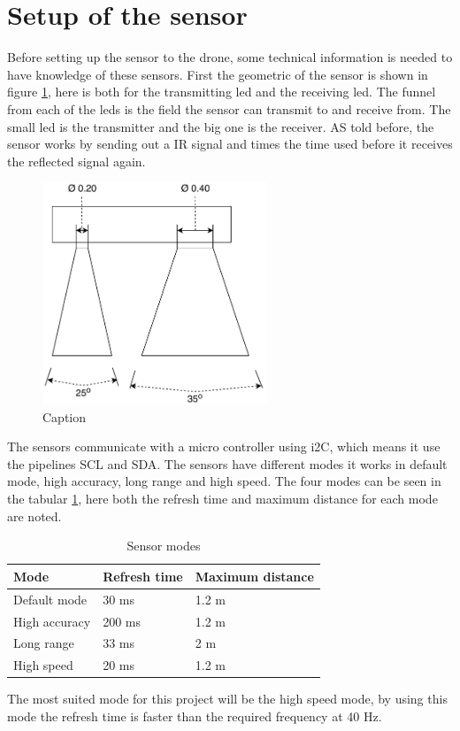 \section{Setup of the sensor}\label{setup_sensor}
Before setting up the sensor to the drone, some technical information is needed to have knowledge of these sensors.
First the geometric of the sensor is shown in figure \ref{fig:sensor_geometric}, here is both for the transmitting led and the receiving led. The funnel from each of the leds is the field the sensor can transmit to and receive from. The small led is the transmitter and the big one is the receiver. 
AS told before, the sensor works by sending out a IR signal and times the time used before it receives the reflected signal again.
\begin{figure}[H]
    \centering
    \includegraphics[width=0.6\textwidth]{figures/ch_design/Sensor.pdf}
    \caption{Caption}
    \label{fig:sensor_geometric}
\end{figure}
The sensors communicate with a micro controller using i2C, which means it use the pipelines SCL and SDA. The sensors have different modes it works in default mode, high accuracy, long range and high speed. The four modes can be seen in the tabular \ref{tab:sensor_mode}, here both the refresh time and maximum distance for each mode are noted. 
\begin{table}[H]
\caption{Sensor modes}\label{tab:sensor_mode}
\begin{tabular}{|l|l|l|}
\hline
\textbf{Mode}          & \textbf{Refresh time} & \textbf{Maximum distance} \\ \hline
Default mode  & 30 ms        & 1.2 m            \\ \hline
High accuracy & 200 ms       & 1.2 m            \\ \hline
Long range    & 33 ms        & 2 m              \\ \hline
High speed    & 20 ms        & 1.2 m            \\ \hline
\end{tabular}
\end{table}
The most suited mode for this project will be the high speed mode, by using this mode the refresh time is faster than the required frequency at 40 Hz.  

